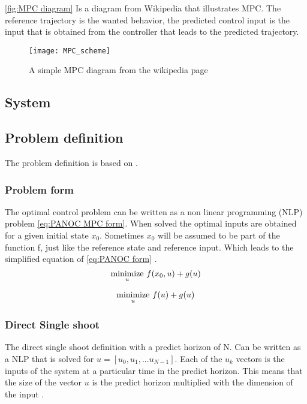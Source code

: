 	\eqref{fig:MPC diagram} Is a diagram from Wikipedia \cite{Wikipedia} that illustrates MPC. The reference trajectory is the wanted behavior, the predicted control input is the input that is obtained from the controller that leads to the predicted trajectory.
	\begin{figure}[h]
		\centering
		\texttt{[image: MPC\_scheme]}
		\caption{A simple MPC diagram from the wikipedia page \cite{Wikipedia}}
		\label{fig:MPC diagram}
	\end{figure}
			
	\subsection{System}
		
	\subsection{Problem definition}
	The problem definition is based on \cite{Diehl2005}.
		\subsubsection{Problem form}
			The optimal control problem can be written as a non linear programming (NLP) problem  \eqref{eq:PANOC MPC form}. When solved the optimal inputs are obtained for a given initial state $x_0$. Sometimes $x_0$ will be assumed to be part of the function f, just like the reference state and reference input. Which leads to the simplified equation of \eqref{eq:PANOC form} .
			\begin{equation}
				\underset{u}{\operatorname*{minimize}} \  f(x_0,u) + g(u)
				\label{eq:PANOC MPC form}
			\end{equation}
			
			\begin{equation}
				\underset{u}{\operatorname*{minimize}} \  f(u) + g(u)
				\label{eq:PANOC form}
			\end{equation}
		\subsubsection{Direct Single shoot}
			The direct single shoot definition with a predict horizon of N. Can be written as a NLP that is solved for $u=[u_0,u_1,... u_{N-1}]$. Each of the $u_k$ vectors is the inputs of the system at a particular time in the predict horizon. This means that the size of the vector $u$ is the predict horizon multiplied with the dimension of the input .
			
